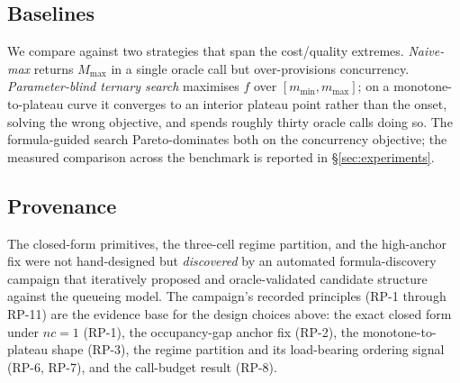 \subsection{Baselines}
\label{sec:algo-baselines}

We compare against two strategies that span the cost/quality extremes. \emph{Naive-max}
returns $M_{\max}$ in a single oracle call but over-provisions concurrency.
\emph{Parameter-blind ternary search} maximises $f$ over $[m_{\min}, m_{\max}]$; on a
monotone-to-plateau curve it converges to an interior plateau point rather than the onset,
solving the wrong objective, and spends roughly thirty oracle calls doing so. The
formula-guided search Pareto-dominates both on the concurrency objective; the measured
comparison across the benchmark is reported in \S\ref{sec:experiments}.

\subsection{Provenance}
\label{sec:algo-provenance}

The closed-form primitives, the three-cell regime partition, and the high-anchor fix were
not hand-designed but \emph{discovered} by an automated formula-discovery campaign that
iteratively proposed and oracle-validated candidate structure against the queueing model.
The campaign's recorded principles (RP-1 through RP-11) are the evidence base for the
design choices above: the exact closed form under $nc=1$ (RP-1), the occupancy-gap
anchor fix (RP-2), the monotone-to-plateau shape (RP-3), the regime partition and its
load-bearing ordering signal (RP-6, RP-7), and the call-budget result (RP-8).
